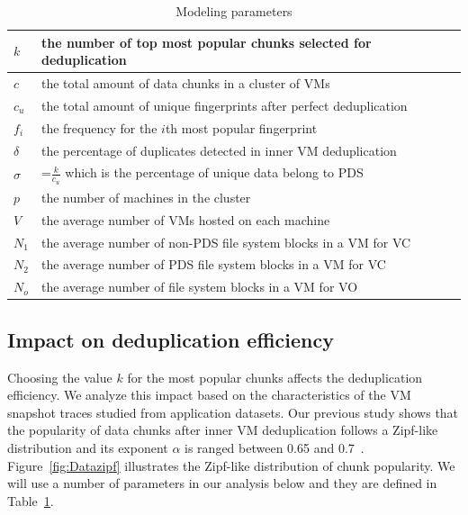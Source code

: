 \begin{table}[htbp]
\centering
\begin{tabular}{|p{1.25cm}|p{5.5cm}|}
\hline
$k$ &  the number of top most popular chunks selected for deduplication\\ 
\hline
$c$ &  the total amount of data chunks in a cluster of VMs\\ 
\hline
$c_u$ &  the total amount of unique fingerprints after perfect  deduplication\\
\hline
$f_i$ &  the frequency for the $i$th most popular fingerprint\\
\hline
$\delta$ &  the percentage of duplicates detected in inner VM deduplication\\
\hline
$\sigma$ & =$\frac{k}{c_u}$ which is  the percentage of unique data  belong to  PDS\\
\hline
$p$ & the number of machines in the cluster\\
\hline
$V$ & the average number of VMs hosted on each machine\\
\hline
$N_1$ & the average number  of non-PDS file system blocks  in a VM for VC\\
\hline
$N_2$ & the average number  of PDS file system blocks  in a VM for VC\\
\hline
$N_o$ & the average number  of file system blocks  in a VM for VO\\
\hline
\end{tabular}
\caption{Modeling  parameters}
\label{tab:symbol}
\end{table}

\subsection{Impact on deduplication efficiency}
Choosing the value  $k$ for the most popular chunks affects the deduplication efficiency.
We analyze this impact based on the characteristics  of the VM snapshot traces
studied from  application datasets.
Our previous study shows that the popularity of data chunks after inner VM deduplication follows 
a Zipf-like distribution\cite{Breslau1999a} and its
exponent $\alpha$ is ranged between 0.65  and  0.7~\cite{WeiZhangIEEE}. 
Figure~\ref{fig:Datazipf} illustrates the Zipf-like distribution of chunk popularity.
We will use a number of parameters in our analysis below and they are defined in
Table~\ref{tab:symbol}. 

